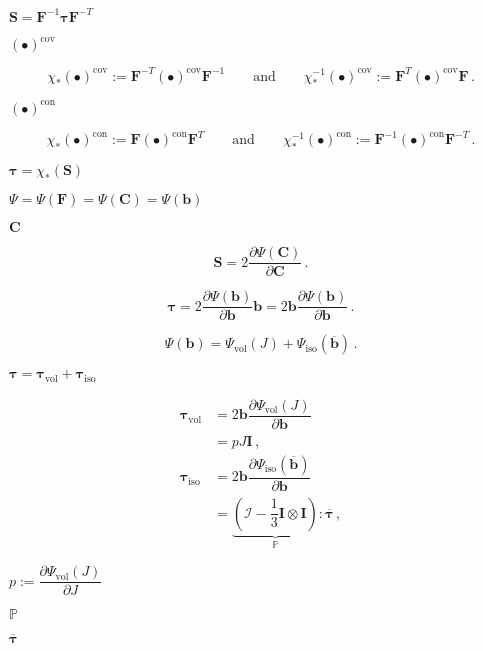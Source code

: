 \documentclass{article}
\begin{document}
$\mathbf{S} = {\mathbf{F}}^{-1} \boldsymbol{\tau} {\mathbf{F}}^{-T}$
\pagebreak

$(\bullet)^{\text{cov}}$
\pagebreak

\[ \chi_{*}(\bullet)^{\text{cov}}:= \mathbf{F}^{-T} (\bullet)^{\text{cov}} \mathbf{F}^{-1} \qquad \text{and} \qquad \chi^{-1}_{*}(\bullet)^{\text{cov}}:= \mathbf{F}^{T} (\bullet)^{\text{cov}} \mathbf{F} \, . \]
\pagebreak

$(\bullet)^{\text{con}}$
\pagebreak

\[ \chi_{*}(\bullet)^{\text{con}}:= \mathbf{F} (\bullet)^{\text{con}} \mathbf{F}^T \qquad \text{and} \qquad \chi^{-1}_{*}(\bullet)^{\text{con}}:= \mathbf{F}^{-1} (\bullet)^{\text{con}} \mathbf{F}^{-T} \, . \]
\pagebreak

$\boldsymbol{\tau} = \chi_{*}(\mathbf{S})$
\pagebreak

$\Psi = \Psi(\mathbf{F}) = \Psi(\mathbf{C}) = \Psi(\mathbf{b})$
\pagebreak

$\mathbf{C}$
\pagebreak

\[ \mathbf{S} = 2 \dfrac{\partial \Psi(\mathbf{C})}{\partial \mathbf{C}} \, . \]
\pagebreak

\[ \boldsymbol{\tau} = 2 \dfrac{\partial \Psi(\mathbf{b})}{\partial \mathbf{b}} \mathbf{b} = 2 \mathbf{b} \dfrac{\partial \Psi(\mathbf{b})}{\partial \mathbf{b}} \, . \]
\pagebreak

\[ \Psi(\mathbf{b}) = \Psi_{\text{vol}}(J) + \Psi_{\text{iso}}(\overline{\mathbf{b}}) \, . \]
\pagebreak

$\boldsymbol{\tau} = \boldsymbol{\tau}_{\text{vol}} + \boldsymbol{\tau}_{\text{iso}}$
\pagebreak

\begin{align*} \boldsymbol{\tau}_{\text{vol}} &= 2 \mathbf{b} \dfrac{\partial \Psi_{\textrm{vol}}(J)}{\partial \mathbf{b}} \\ &= p J\mathbf{I} \, , \\ \boldsymbol{\tau}_{\text{iso}} &= 2 \mathbf{b} \dfrac{\partial \Psi_{\textrm{iso}} (\overline{\mathbf{b}})}{\partial \mathbf{b}} \\ &= \underbrace{( \mathcal{I} - \dfrac{1}{3} \mathbf{I} \otimes \mathbf{I})}_{\mathbb{P}} : \overline{\boldsymbol{\tau}} \, , \end{align*}
\pagebreak

$p := \dfrac{\partial \Psi_{\text{vol}}(J)}{\partial J}$
\pagebreak

$\mathbb{P}$
\pagebreak

$\overline{\boldsymbol{\tau}}$
\pagebreak
\end{document}
